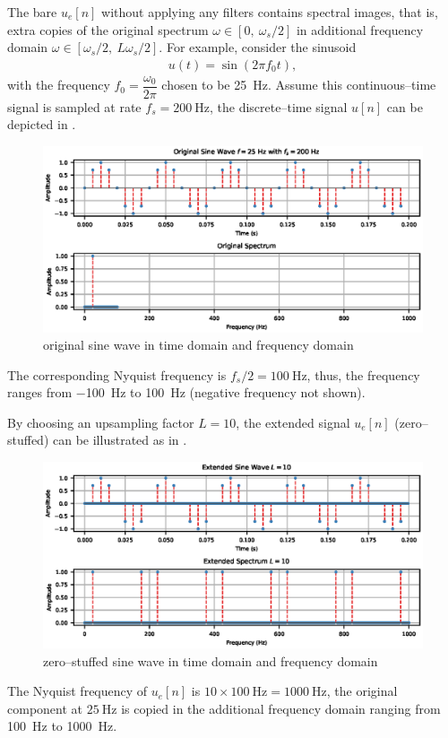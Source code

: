 The bare $u_e[n]$ without applying any filters contains spectral images, that is, extra copies of the original spectrum $\omega\in[0,~\omega_s/2]$ in additional frequency domain $\omega\in[\omega_s/2,~L\omega_s/2]$. For example, consider the sinusoid
\begin{gather}
u(t)=\sin\left(2\pi{}f_0t\right),
\end{gather}
with the frequency $f_0=\dfrac{\omega_0}{2\pi}$ chosen to be \SI{25}{\hertz}. Assume this continuous--time signal is sampled at rate $f_s=\SI{200}{\hertz}$, the discrete--time signal $u[n]$ can be depicted in .
\begin{figure}[H]
\centering
\includegraphics{PIC/PureSineOrigin}
\caption{original sine wave in time domain and frequency domain}\label{fig:original}
\end{figure}
The corresponding Nyquist frequency is $f_s/2=\SI{100}{\hertz}$, thus, the frequency ranges from \SI{-100}{\hertz} to \SI{100}{\hertz} (negative frequency not shown).

By choosing an upsampling factor $L=10$, the extended signal $u_e[n]$ (zero--stuffed) can be illustrated as in .
\begin{figure}[H]
\centering
\includegraphics{PIC/PureSineExtended}
\caption{zero--stuffed sine wave in time domain and frequency domain}\label{fig:extended}
\end{figure}
The Nyquist frequency of $u_e[n]$ is $10\times\SI{100}{\hertz}=\SI{1000}{\hertz}$, the original component at $\SI{25}{\hertz}$ is copied in the additional frequency domain ranging from \SI{100}{\hertz} to \SI{1000}{\hertz}.

